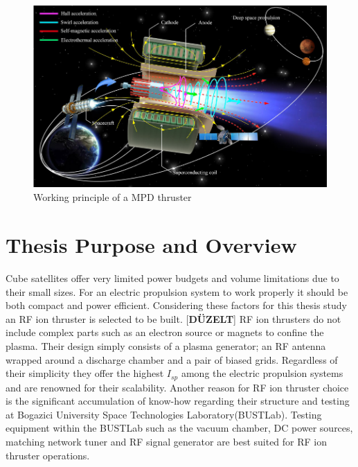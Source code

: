 \begin{figure}[ht]
    \centering
    \includegraphics[scale=0.6]{fig/MPD.png}
    \caption[Working principle of a MPD thruster]{Working principle of a MPD thruster\cite{zheng2021integrated}}
    \label{fig:MPD}
\end{figure}

\newpage

\section{Thesis Purpose and Overview}\label{purposeofthesis}
Cube satellites offer very limited power budgets and volume limitations due to their small sizes. For an electric propulsion system to work properly it should be both compact and power efficient. Considering these factors for this thesis study an RF ion thruster is selected to be built. [\textbf{DÜZELT}]
RF ion thrusters do not include complex parts such as an electron source or magnets to confine the plasma. Their design simply consists of a plasma generator; an RF antenna wrapped around a discharge chamber and a pair of biased grids. Regardless of their simplicity they offer the highest $I_{sp}$ among the electric propulsion systems and are renowned for their scalability\cite{tsay2016maturation}. 
Another reason for RF ion thruster choice is the significant accumulation of know-how regarding their structure and testing at Bogazici University Space Technologies Laboratory(BUSTLab). Testing equipment within the BUSTLab such as the vacuum chamber, DC power sources, matching network tuner and RF signal generator are best suited for RF ion thruster operations\cite{yavuz2013prototype}.  
